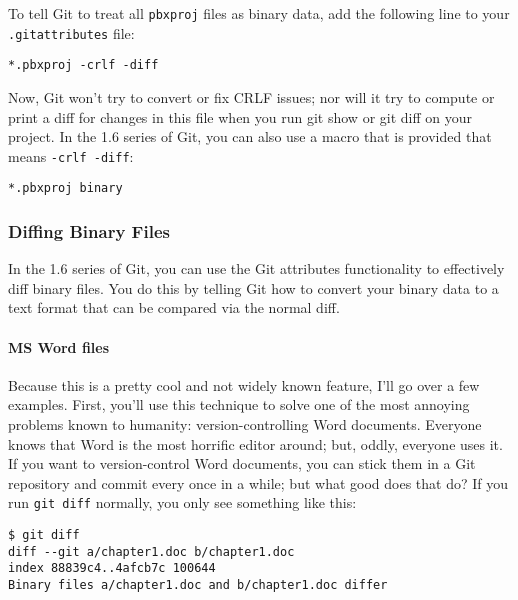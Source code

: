 \documentclass[a4paper]{book}
\begin{document}
To tell Git to treat all \texttt{pbxproj} files as binary data, add the following line to your \texttt{.gitattributes} file:

\begin{shaded}\begin{verbatim}
*.pbxproj -crlf -diff
\end{verbatim}\end{shaded}

Now, Git won't try to convert or fix CRLF issues; nor will it try to compute or print a diff for changes in this file when you run git show or git diff on your project. In the 1.6 series of Git, you can also use a macro that is provided that means \texttt{-crlf -diff}:

\begin{shaded}\begin{verbatim}
*.pbxproj binary
\end{verbatim}\end{shaded}

\subsubsection{Diffing Binary Files}

In the 1.6 series of Git, you can use the Git attributes functionality to effectively diff binary files. You do this by telling Git how to convert your binary data to a text format that can be compared via the normal diff.

\paragraph{MS Word files}

Because this is a pretty cool and not widely known feature, I'll go over a few examples. First, you'll use this technique to solve one of the most annoying problems known to humanity: version-controlling Word documents. Everyone knows that Word is the most horrific editor around; but, oddly, everyone uses it. If you want to version-control Word documents, you can stick them in a Git repository and commit every once in a while; but what good does that do? If you run \texttt{git diff} normally, you only see something like this:

\begin{shaded}\begin{verbatim}
$ git diff
diff --git a/chapter1.doc b/chapter1.doc
index 88839c4..4afcb7c 100644
Binary files a/chapter1.doc and b/chapter1.doc differ
\end{verbatim}\end{shaded}
\end{document}
